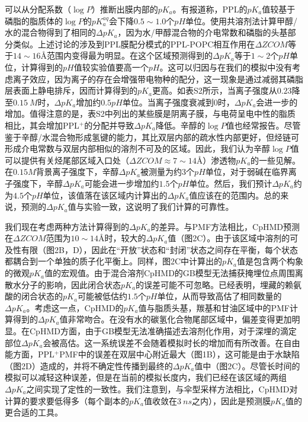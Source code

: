 \documentclass[journal=,manuscript=artical,email=false]{achemso}
\begin{document}
可以从分配系数（$\log P$）推断出膜内部的$pK_a$。有报道称，PPL的$pK_a$值较基于磷脂的脂质体的$\log P$的$pK^{aq}_a$会下降$0.5\sim 1.0$个$pH$单位。使用共溶剂法计算甲醇/水的混合物得到了相同的$\Delta pK_a$，因为水/甲醇混合物的介电常数和磷脂的头基部分类似。上述讨论的涉及到PPL膜配分模式的PPL-POPC相互作用在$\Delta ZCOM$等于$14\sim 16$\AA 范围内变得最为明显。在这个区域预测得到的$\Delta pK_a$等于$1\sim 2$个$pH$单位，计算得到的$pH$值较实验值要高一个$pH$。这可以归因与在我们的模拟中没有考虑离子效应，因为离子的存在会增强带电物种的配分，这一现象是通过减弱其磷脂层表面上静电排斥，因而计算得到的$pK_a$更高。如表S2所示，当离子强度从$0.23$降至$0.15~M$时，$\Delta pK_a$增加约$0.5 pH$单位。当离子强度衰减到$0$时，$\Delta pK_a$会进一步的增加。值得注意的是，表S2中列出的某些膜是阴离子膜，与电荷呈电中性的脂质相比，其会增加PPL$^{+}$的分配并导致$\Delta pK_a$降低。辛醇的$\log P$值也经常报告。尽管鉴于辛醇/水混合物形成氢键的能力，其比双层内部的疏水性内部更好，但烃链可形成介电常数与双层内部相似的溶剂不可及的区域。因此，我们认为辛醇$\log P$值可以提供有关烃尾部区域入口处（$\Delta ZCOM \approx 7\sim 14$\AA ）渗透物$pK_a$的一些见解。在$0.15 M$背景离子强度下，辛醇$\Delta pK_a$被测量为约$3$个$pH$单位，对于弱碱在临界离子强度下，辛醇$\Delta pK_a$可能会进一步增加约$1.5$个$pH$单位。然后，我们预计$\Delta pK_a$约为$4.5$个$pH$单位，该值落在该区域内计算出的$\Delta pK_a$值应该在的范围内。总的来说，预测的$\Delta pK_a$值与实验一致，这说明了我们计算的可靠性。

我们现在考虑两种方法计算得到的$\Delta pK_a$的差异。与PMF方法相比，CpHMD预测在$\Delta ZCOM$范围为$10\sim 14$\AA 时，较大的$\Delta pK_a$值（图2C）。由于该区域中溶剂的可及性有限（图2B，D），因此在“开放”状态和“封闭”状态之间存在平衡，每个状态都耦合到一个单独的质子化平衡上。同样，图2C中计算出的$pK_a$值是包含两个构象的微观$pK_a$值的宏观值。由于混合溶剂CpHMD的GB模型无法捕获掩埋位点周围离散水分子的影响，因此闭合状态$pK_a$的误差可能不可忽略。已经表明，埋藏的赖氨酸的闭合状态的$pK_a$可能被低估约$1.5$个$pH$单位，从而导致高估了相同数量的$\Delta pK_a$。考虑这一点，CpHMD的$pK_a$值与脂质头基，羰基和甘油区域中的PMF计算得到的$\Delta pK_a$值非常吻合。在没有水的碳氢化合物尾部区域中，偏差变得更加明显。在CpHMD方面，由于GB模型无法准确描述去溶剂化作用，对于深埋的滴定部位$\Delta pK_a$会被高估。这一系统误差不会随着模拟时长的增加而有所改善。在自由能方面，PPL${^+}$PMF中的误差在双层中心附近最大（图1B），这可能是由于水缺陷（图2D）造成的，并将不确定性传播到最终的$\Delta pK_a$值中（图2C）。尽管长时间的模拟可以减轻这种误差，但是在当前的模拟长度内，我们已经在该区域的两组$\Delta pK_a$之间实现了定性的一致性。我们注意到，与伞型采样方法相比，CpHMD对计算的要求要低得多（每个副本的$pK_a$值收敛在$3~ns$之内），因此是预测膜$pK_a$值的更合适的工具。
\end{document}
